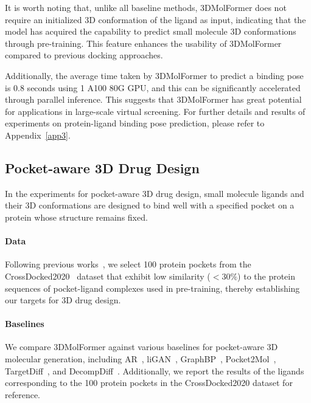 It is worth noting that, unlike all baseline methods, 3DMolFormer does not require an initialized 3D conformation of the ligand as input, indicating that the model has acquired the capability to predict small molecule 3D conformations through pre-training. This feature enhances the usability of 3DMolFormer compared to previous docking approaches.

Additionally, the average time taken by 3DMolFormer to predict a binding pose is 0.8 seconds using 1 A100 80G GPU, and this can be significantly accelerated through parallel inference. This suggests that 3DMolFormer has great potential for applications in large-scale virtual screening. For further details and results of experiments on protein-ligand binding pose prediction, please refer to Appendix~\ref{app3}.

\subsection{Pocket-aware 3D Drug Design}
\label{exp-drug-design}
In the experiments for pocket-aware 3D drug design, small molecule ligands and their 3D conformations are designed to bind well with a specified pocket on a protein whose structure remains fixed.

\paragraph{Data} Following previous works~\citep{Pocket2Mol,TargetDiff,DecompDiff}, we select 100 protein pockets from the CrossDocked2020~\citep{CrossDocked} dataset that exhibit low similarity ($<30\%$) to the protein sequences of pocket-ligand complexes used in pre-training, thereby establishing our targets for 3D drug design.

\paragraph{Baselines} We compare 3DMolFormer against various baselines for pocket-aware 3D molecular generation, including AR~\citep{AR}, liGAN~\citep{liGAN}, GraphBP~\citep{GraphBP}, Pocket2Mol~\citep{Pocket2Mol}, TargetDiff~\citep{TargetDiff}, and DecompDiff~\citep{DecompDiff}. Additionally, we report the results of the ligands corresponding to the 100 protein pockets in the CrossDocked2020 dataset for reference.

